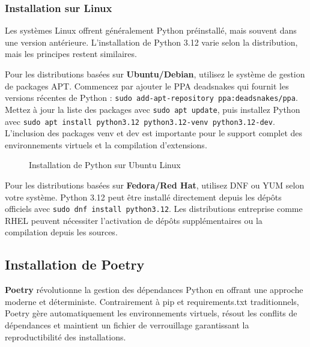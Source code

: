 \subsubsection{Installation sur Linux}

Les systèmes Linux offrent généralement Python préinstallé, mais souvent dans une version antérieure. L'installation de Python 3.12 varie selon la distribution, mais les principes restent similaires.

Pour les distributions basées sur \textbf{Ubuntu/Debian}, utilisez le système de gestion de packages APT. Commencez par ajouter le PPA deadsnakes qui fournit les versions récentes de Python : \texttt{sudo add-apt-repository ppa:deadsnakes/ppa}. Mettez à jour la liste des packages avec \texttt{sudo apt update}, puis installez Python avec \texttt{sudo apt install python3.12 python3.12-venv python3.12-dev}. L'inclusion des packages venv et dev est importante pour le support complet des environnements virtuels et la compilation d'extensions.

\begin{figure}[h]
\centering
{}
\caption{Installation de Python sur Ubuntu Linux}
\end{figure}

Pour les distributions basées sur \textbf{Fedora/Red Hat}, utilisez DNF ou YUM selon votre système. Python 3.12 peut être installé directement depuis les dépôts officiels avec \texttt{sudo dnf install python3.12}. Les distributions entreprise comme RHEL peuvent nécessiter l'activation de dépôts supplémentaires ou la compilation depuis les sources.

\subsection{Installation de Poetry}

\textbf{Poetry} révolutionne la gestion des dépendances Python en offrant une approche moderne et déterministe. Contrairement à pip et requirements.txt traditionnels, Poetry gère automatiquement les environnements virtuels, résout les conflits de dépendances et maintient un fichier de verrouillage garantissant la reproductibilité des installations.

